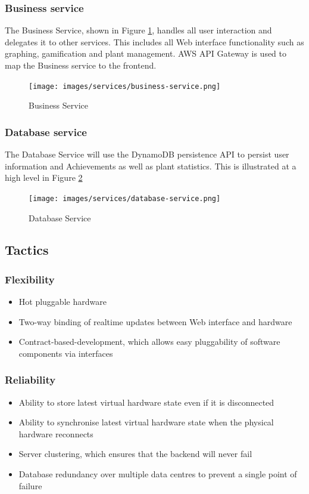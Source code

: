 \documentclass{article}
\begin{document}
\subsubsection{Business service}
The Business Service, shown in Figure \ref{fig:business-service}, handles all user interaction and delegates it to other services. This includes all Web interface functionality such as graphing, gamification and plant management. AWS API Gateway is used to map the Business service to the frontend.

\begin{figure}[h!]
  \texttt{[image: images/services/business-service.png]}
  \caption{Business Service}
  \label{fig:business-service}
\end{figure}

\subsubsection{Database service} \label{sec:database-service}
The Database Service will use the DynamoDB persistence API to persist user information and Achievements as well as plant statistics. This is illustrated at a high level in Figure \ref{fig:database-service}

\begin{figure}[h!]
  \texttt{[image: images/services/database-service.png]}
  \caption{Database Service}
  \label{fig:database-service}
\end{figure}

\subsection{Tactics}

\subsubsection{Flexibility}
\begin{itemize}
	\item Hot pluggable hardware
	\item Two-way binding of realtime updates between Web interface and hardware 
	\item Contract-based-development, which allows easy pluggability of software components via interfaces
\end{itemize}

\subsubsection{Reliability}
\begin{itemize}
	\item Ability to store latest virtual hardware state even if it is disconnected
	\item Ability to synchronise latest virtual hardware state when the physical hardware reconnects
	\item Server clustering, which ensures that the backend will never fail
	\item Database redundancy over multiple data centres to prevent a single point of failure
\end{itemize}
\end{document}
